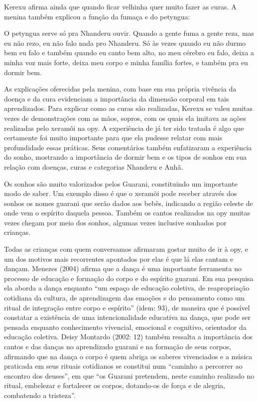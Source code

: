 \documentclass{article}
\begin{document}
Kerexu afirma ainda que quando ficar velhinha quer muito fazer as curas.
A menina tamb\'em explicou a fun\c{c}\~ao da fuma\c{c}a e do petyngua:

O petyngua serve s\'o pra Nhanderu ouvir. Quando a gente fuma a gente
reza, mas eu n\~ao rezo, eu n\~ao falo nada pro Nhanderu. S\'o \`as
vezes quando eu n\~ao durmo bem eu falo e tamb\'em quando eu canto bem
alto, no meu c\'erebro eu falo, deixa a minha voz mais forte, deixa meu
corpo e minha fam\'ilia fortes, e tamb\'em pra eu dormir bem.

As explica\c{c}\~oes oferecidas pela menina, com base em sua pr\'opria
viv\^encia da doen\c{c}a e da cura evidenciam a import\^ancia da
dimens\~ao corporal em tais aprendizados. Para explicar como as curas
s\~ao realizadas, Kerexu se valeu muitas vezes de demonstra\c{c}\~oes
com as m\~aos, sopros, com os quais ela imitava as a\c{c}\~oes
realizadas pelo xeram\~oi na opy. A experi\^encia de j\'a ter sido
tratada \'e algo que certamente foi muito importante para que ela
pudesse relatar com mais profundidade essas pr\'aticas. Seus
coment\'arios tamb\'em enfatizaram a experi\^encia do sonho, mostrando
a import\^ancia de dormir bem e os tipos de sonhos em sua rela\c{c}\~ao
com doen\c{c}as, curas e categorias Nhanderu e Anh\~a.

Os sonhos s\~ao muito valorizados pelos Guarani, constituindo um
importante modo de saber. Um exemplo disso \'e que o xeram\~oi pode
receber atrav\'es dos sonhos os nomes guarani que ser\~ao dados aos
beb\^es, indicando a regi\~ao celeste de onde vem o esp\'irito daquela
pessoa. Tamb\'em os cantos realizados na opy muitas vezes chegam por
meio dos sonhos, algumas vezes inclusive sonhados por crian\c{c}as.

Todas as crian\c{c}as com quem conversamos afirmaram gostar muito de ir
\`a opy, e um dos motivos mais recorrentes apontados por elas \'e que
l\'a elas cantam e dan\c{c}am. Menezes (2004) afirma que a dan\c{c}a
\'e uma importante ferramenta no processo de educa\c{c}\~ao e
forma\c{c}\~ao do corpo e do esp\'irito guarani. Em sua pesquisa ela
aborda a dan\c{c}a enquanto {\textquotedblleft}um espa\c{c}o de
educa\c{c}\~ao coletiva, de reapropria\c{c}\~ao cotidiana da cultura,
de aprendizagem das emo\c{c}\~oes e do pensamento como um ritual de
integra\c{c}\~ao entre corpo e esp\'irito{\textquotedblright} (idem:
93), de maneira que \'e poss\'ivel constatar a exist\^encia de uma
intencionalidade educativa na dan\c{c}a, que pode ser pensada enquanto
conhecimento vivencial, emocional e cognitivo, orientador da
educa\c{c}\~ao coletiva. Deisy Montardo (2002: 12) tamb\'em ressalta a
import\^ancia dos cantos e das dan\c{c}as no aprendizado guarani e na
forma\c{c}\~ao de seus corpos, afirmando que na dan\c{c}a o corpo \'e
quem abriga os saberes vivenciados e a m\'usica praticada em seus
rituais cotidianos se constitui num {\textquotedblleft}caminho a
percorrer ao encontro dos deuses{\textquotedblright}, em que
{\textquotedblleft}os Guarani pretendem, neste caminho realizado no
ritual, embelezar e fortalecer os corpos, dotando-os de for\c{c}a e de
alegria, combatendo a tristeza{\textquotedblright}.
\end{document}
